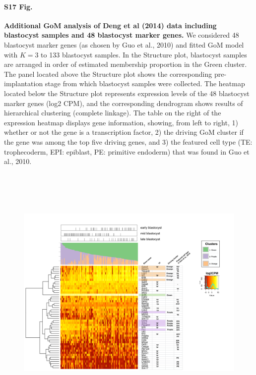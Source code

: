 \documentclass[10pt,letterpaper]{article}
\begin{document}
\paragraph*{S17 Fig.}

\label{figS17}
{\bf Additional GoM analysis of Deng et al (2014) data including blastocyst samples and 48 blastocyst marker genes.} We considered 48 blastocyst marker genes 
(as chosen by Guo et al., 2010) and fitted GoM model with $K = 3$ to 133 blastocyst samples. In the Structure plot, blastocyst samples are arranged in order of estimated membership proportion in the Green cluster. The panel located above the Structure plot shows the corresponding pre-implantation stage from which blastocyst samples were collected. The heatmap located below the Structure plot represents expression levels of the 48 blastocyst marker genes (log2 CPM), and the corresponding dendrogram shows results of hierarchical clustering (complete linkage). The table on the right of the expression heatmap displays gene information, showing, from left to right, 1) whether or not the gene is a transcription factor, 2) the driving GoM cluster if the gene was among the top five driving genes, and 3) the featured cell type (TE: trophecoderm, EPI: epiblast, PE: primitive endoderm) that was found in Guo et al., 2010.
\begin{figure}[ht]
\centering
\includegraphics[height=5in, width=6in]{../../src/figure/deng-digging-final.Rmd/deng-structure-combo.png}
\end{figure}
\end{document}
